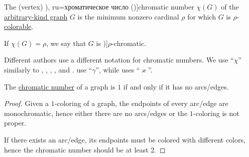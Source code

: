 \begin{definition}\label{def:chromatic_number}
  The (vertex) \term[bg=хроматично число (\cite[142]{Мирчев2001}), ru=хроматическое число (\cite[235]{Емеличев1990})]{chromatic number} \( \chi(G) \) of the \hyperref[rem:arbitrary_kind_graph]{arbitrary-kind graph} \( G \) is the minimum nonzero cardinal \( \rho \) for which \( G \) is \( \rho \)-\hyperref[def:graph_coloring/colorable]{colorable}.

  If \( \chi(G) = \rho \), we say that \( G \) is \term[ru=\( \rho \)-хроматический (граф) (\cite[236]{Емеличев1990})]{\( \rho \)-chromatic}.
\end{definition}
\begin{comments}
  \item Different authors use a different notation for chromatic numbers. We use \enquote{\( \chi \)} similarly to , , , ,  and .  use \enquote{\( \gamma \)}, while  uses \enquote{\( \varkappa \)}.
\end{comments}

\begin{proposition}\label{thm:chromatic_number_edgeless}
  The \hyperref[def:chromatic_number]{chromatic number} of a graph is \( 1 \) if and only if it has no arcs/edges.
\end{proposition}
\begin{proof}
  \SufficiencySubProof Given a \( 1 \)-coloring of a graph, the endpoints of every arc/edge are monochromatic, hence either there are no arcs/edges or the \( 1 \)-coloring is not proper.

  \NecessitySubProof If there exists an arc/edge, its endpoints must be colored with different colors, hence the chromatic number should be at least \( 2 \).
\end{proof}

